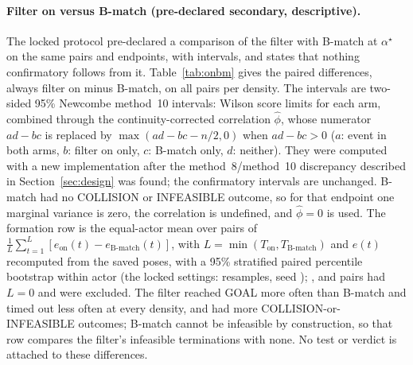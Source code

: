 \documentclass[11pt]{article}
\begin{document}
\paragraph{Filter on versus B-match (pre-declared secondary, descriptive).} The locked protocol
pre-declared a comparison of the filter with B-match at $\alpha^\star$ on the same pairs and
endpoints, with intervals, and states that nothing confirmatory follows from it.
Table~\ref{tab:onbm} gives the paired differences, always filter on minus B-match, on all
\PairsPerDensity{} pairs per density. The intervals are two-sided 95\% Newcombe method~10
intervals: Wilson score limits for each arm, combined through the continuity-corrected correlation
$\hat\phi$, whose numerator $ad-bc$ is replaced by $\max(ad-bc-n/2,0)$ when $ad-bc>0$ ($a$: event
in both arms, $b$: filter on only, $c$: B-match only, $d$: neither). They were computed with a new
implementation after the method~8/method~10 discrepancy described in Section~\ref{sec:design} was
found; the confirmatory intervals are unchanged.
B-match had no COLLISION or INFEASIBLE outcome, so for that endpoint one marginal variance is zero,
the correlation is undefined, and $\hat\phi=0$ is used. The formation row is the equal-actor mean
over pairs of $\frac{1}{L}\sum_{t=1}^{L}[e_{\text{on}}(t)-e_{\text{B-match}}(t)]$, with
$L=\min(T_{\text{on}},T_{\text{B-match}})$ and $e(t)$ recomputed from the saved poses, with a 95\%
stratified paired percentile bootstrap within actor (the locked settings: \BootReps{} resamples,
seed \BootSeed); \OnBmFormExclone, \OnBmFormExcltwo{} and \OnBmFormExclthree{} pairs had $L=0$
and were excluded. The filter reached GOAL more often than B-match and timed out less often at every
density, and had more COLLISION-or-INFEASIBLE outcomes; B-match cannot be infeasible by construction,
so that row compares the filter's infeasible terminations with none. No test or verdict is
attached to these differences.
\end{document}
